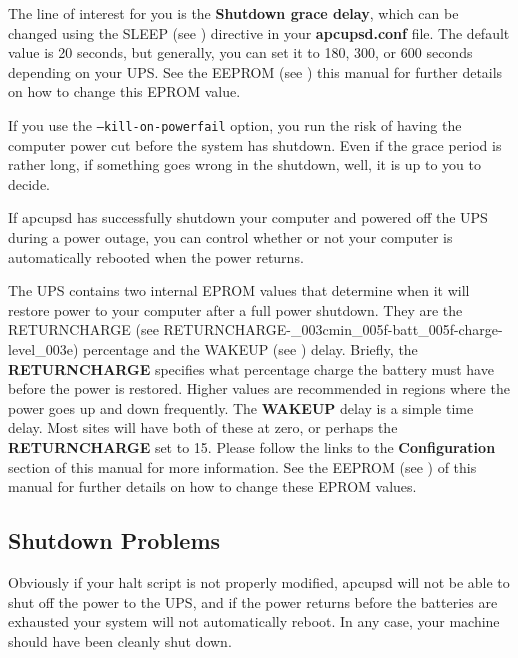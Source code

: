 {{{{{{{{{\begin{verbatim}
\end{verbatim}
\normalsize

The line of interest for you is the {\bf Shutdown grace delay}, which can be
changed using the SLEEP (see 
) directive in your
{\bf apcupsd.conf} file. The default value is 20 seconds, but generally, you
can set it to 180, 300, or 600 seconds depending on your UPS. See the EEPROM
(see 
) this
manual for further details on how to change this EPROM value.  

If you use the \texttt{{---}kill-on-powerfail} option, you run the risk of having
the computer power cut before the system has shutdown. Even if the grace
period is rather long, if something goes wrong in the shutdown, well, it is up
to you to decide.  

If apcupsd has successfully shutdown your computer and powered off the UPS
during a power outage, you can control whether or not your computer is
automatically rebooted when the power returns.  

The UPS contains two internal EPROM values that determine when it will restore
power to your computer after a full power shutdown. They are the RETURNCHARGE
(see 
{RETURNCHARGE-_003cmin_005f-batt_005f-charge-level_003e})
percentage and the WAKEUP (see 
) delay. Briefly, the
{\bf RETURNCHARGE} specifies what percentage charge the battery must have
before the power is restored. Higher values are recommended in regions where
the power goes up and down frequently. The {\bf WAKEUP} delay is a simple time
delay. Most sites will have both of these at zero, or perhaps the {\bf
RETURNCHARGE} set to 15. Please follow the links to the {\bf Configuration}
section of this manual for more information.  See the EEPROM (see 
) of this
manual for further details on how to change these EPROM values. 

\label{Shutdown-Problems}

\subsection*{Shutdown Problems}

Obviously if your halt script is not properly modified, apcupsd will not be
able to shut off the power to the UPS, and if the power returns before the
batteries are exhausted your system will not automatically reboot. In any
case, your machine should have been cleanly shut down. 

}}}}}}}}}
